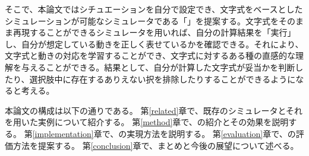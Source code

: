 そこで、本論文ではシチュエーションを自分で設定でき、文字式をベースとしたシミュレーションが可能なシミュレータである「\simname」を提案する。文字式をそのまま再現することができるシミュレータを用いれば、自分の計算結果を「実行」し、自分が想定している動きを正しく表せているかを確認できる。それにより、文字式と動きの対応を学習することができ、文字式に対するある種の直感的な理解を与えることができる。結果として、自分が計算した文字式が妥当かを判断したり、選択肢中に存在するありえない択を排除したりすることができるようになると考える。

本論文の構成は以下の通りである。
第\ref{related}章で、既存のシミュレータとそれを用いた実例について紹介する。
第\ref{method}章で、\simname の紹介とその効果を説明する。
第\ref{implementation}章で、\simname の実現方法を説明する。
第\ref{evaluation}章で、\simname の評価方法を提案する。
第\ref{conclusion}章で、まとめと今後の展望について述べる。
